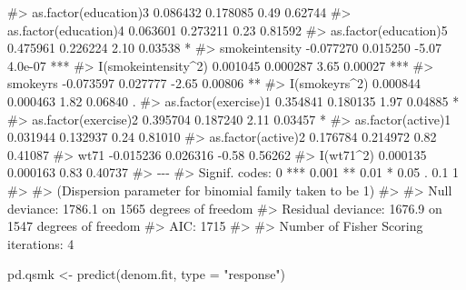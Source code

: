 \documentclass[
  10pt,
  a4paper,
]{book}
\newenvironment{Shaded}{\begin{snugshade}}{\end{snugshade}}
\newcommand{\AttributeTok}[1]{\textcolor[rgb]{0.40,0.45,0.13}{#1}}
\newcommand{\CommentTok}[1]{\textcolor[rgb]{0.37,0.37,0.37}{#1}}
\newcommand{\FunctionTok}[1]{\textcolor[rgb]{0.28,0.35,0.67}{#1}}
\newcommand{\NormalTok}[1]{\textcolor[rgb]{0.00,0.46,0.62}{#1}}
\newcommand{\OtherTok}[1]{\textcolor[rgb]{0.00,0.46,0.62}{#1}}
\newcommand{\StringTok}[1]{\textcolor[rgb]{0.13,0.47,0.30}{#1}}
\begin{document}
\begin{Shaded}
\begin{Highlighting}[]
\CommentTok{\#\textgreater{} as.factor(education)3  0.086432   0.178085    0.49  0.62744    }
\CommentTok{\#\textgreater{} as.factor(education)4  0.063601   0.273211    0.23  0.81592    }
\CommentTok{\#\textgreater{} as.factor(education)5  0.475961   0.226224    2.10  0.03538 *  }
\CommentTok{\#\textgreater{} smokeintensity        {-}0.077270   0.015250   {-}5.07  4.0e{-}07 ***}
\CommentTok{\#\textgreater{} I(smokeintensity\^{}2)    0.001045   0.000287    3.65  0.00027 ***}
\CommentTok{\#\textgreater{} smokeyrs              {-}0.073597   0.027777   {-}2.65  0.00806 ** }
\CommentTok{\#\textgreater{} I(smokeyrs\^{}2)          0.000844   0.000463    1.82  0.06840 .  }
\CommentTok{\#\textgreater{} as.factor(exercise)1   0.354841   0.180135    1.97  0.04885 *  }
\CommentTok{\#\textgreater{} as.factor(exercise)2   0.395704   0.187240    2.11  0.03457 *  }
\CommentTok{\#\textgreater{} as.factor(active)1     0.031944   0.132937    0.24  0.81010    }
\CommentTok{\#\textgreater{} as.factor(active)2     0.176784   0.214972    0.82  0.41087    }
\CommentTok{\#\textgreater{} wt71                  {-}0.015236   0.026316   {-}0.58  0.56262    }
\CommentTok{\#\textgreater{} I(wt71\^{}2)              0.000135   0.000163    0.83  0.40737    }
\CommentTok{\#\textgreater{} {-}{-}{-}}
\CommentTok{\#\textgreater{} Signif. codes:  0 \textquotesingle{}***\textquotesingle{} 0.001 \textquotesingle{}**\textquotesingle{} 0.01 \textquotesingle{}*\textquotesingle{} 0.05 \textquotesingle{}.\textquotesingle{} 0.1 \textquotesingle{} \textquotesingle{} 1}
\CommentTok{\#\textgreater{} }
\CommentTok{\#\textgreater{} (Dispersion parameter for binomial family taken to be 1)}
\CommentTok{\#\textgreater{} }
\CommentTok{\#\textgreater{}     Null deviance: 1786.1  on 1565  degrees of freedom}
\CommentTok{\#\textgreater{} Residual deviance: 1676.9  on 1547  degrees of freedom}
\CommentTok{\#\textgreater{} AIC: 1715}
\CommentTok{\#\textgreater{} }
\CommentTok{\#\textgreater{} Number of Fisher Scoring iterations: 4}

\NormalTok{pd.qsmk }\OtherTok{\textless{}{-}} \FunctionTok{predict}\NormalTok{(denom.fit, }\AttributeTok{type =} \StringTok{"response"}\NormalTok{)}


\end{Highlighting}
\end{Shaded}
\end{document}
